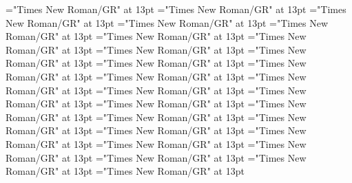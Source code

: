 \documentclass[a4paper]{article}
\begin{document}
\font\spanenCmPossibilitypublishStemTransTypeAbbreviationPubenCmTranslationpublishStemTypeConfigtranslationsexamplessensesensesentryletDatadicBody="Times New Roman/GR" at 13pt
\font\CmPossibilitypublishStemTransTypeNamePubenCmTranslationpublishStemTypeConfigtranslationsexamplessensesensesentryletDatadicBody="Times New Roman/GR" at 13pt
\font\spanenCmPossibilitypublishStemTransTypeNamePubenCmTranslationpublishStemTypeConfigtranslationsexamplessensesensesentryletDatadicBody="Times New Roman/GR" at 13pt
\font\spanenCmTranslationpublishStemTypeConfigtranslationsexamplessensesensesentryletDatadicBody="Times New Roman/GR" at 13pt
\font\translationLdtetranslationsexamplessensesensesentryletDatadicBody="Times New Roman/GR" at 13pt
\font\spantetranslationLdtetranslationsexamplessensesensesentryletDatadicBody="Times New Roman/GR" at 13pt
\font\spanentranslationLdtetranslationsexamplessensesensesentryletDatadicBody="Times New Roman/GR" at 13pt
\font\spanenexamplessensesensesentryletDatadicBody="Times New Roman/GR" at 13pt
\font\semanticdomainssensesensesentryletDatadicBody="Times New Roman/GR" at 13pt
\font\spanensemanticdomainssensesensesentryletDatadicBody="Times New Roman/GR" at 13pt
\font\semanticdomainabbrensemanticdomainssensesensesentryletDatadicBody="Times New Roman/GR" at 13pt
\font\spanensemanticdomainabbrensemanticdomainssensesensesentryletDatadicBody="Times New Roman/GR" at 13pt
\font\semanticdomainnameensemanticdomainssensesensesentryletDatadicBody="Times New Roman/GR" at 13pt
\font\spanensemanticdomainnameensemanticdomainssensesensesentryletDatadicBody="Times New Roman/GR" at 13pt
\font\spanensensesentryletDatadicBody="Times New Roman/GR" at 13pt
\font{}="Times New Roman/GR" at 13pt
\font\xitemendefinitionLdensensesensesentryletDatadicBody="Times New Roman/GR" at 13pt
\font\spanenxitemendefinitionLdensensesensesentryletDatadicBody="Times New Roman/GR" at 13pt
\font\spanendefinitionLdensensesensesentryletDatadicBody="Times New Roman/GR" at 13pt
\font\xitemtedefinitionLdensensesensesentryletDatadicBody="Times New Roman/GR" at 13pt
\font\spantexitemtedefinitionLdensensesensesentryletDatadicBody="Times New Roman/GR" at 13pt
\font\LexSensepublishStemGlossPubLdensensesensesentryletDatadicBody="Times New Roman/GR" at 13pt
\font\xitemenLexSensepublishStemGlossPubLdensensesensesentryletDatadicBody="Times New Roman/GR" at 13pt
\font\spanenxitemenLexSensepublishStemGlossPubLdensensesensesentryletDatadicBody="Times New Roman/GR" at 13pt
\font\xitemteLexSensepublishStemGlossPubLdensensesensesentryletDatadicBody="Times New Roman/GR" at 13pt
\font\spantexitemteLexSensepublishStemGlossPubLdensensesensesentryletDatadicBody="Times New Roman/GR" at 13pt
\end{document}
